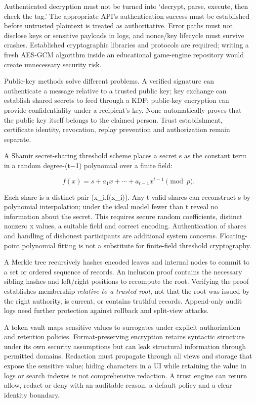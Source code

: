 Authenticated decryption must not be turned into `decrypt, parse, execute, then check the tag.' The appropriate API's authentication success must be established before untrusted plaintext is treated as authoritative. Error paths must not disclose keys or sensitive payloads in logs, and nonce/key lifecycle must survive crashes. Established cryptographic libraries and protocols are required; writing a fresh AES-GCM algorithm inside an educational game-engine repository would create unnecessary security risk.

Public-key methods solve different problems. A verified signature can authenticate a message relative to a trusted public key; key exchange can establish shared secrets to feed through a KDF; public-key encryption can provide confidentiality under a recipient's key. None automatically proves that the public key itself belongs to the claimed person. Trust establishment, certificate identity, revocation, replay prevention and authorization remain separate.

A Shamir secret-sharing threshold scheme places a secret s as the constant term in a random degree-(t−1) polynomial over a finite field:

\[
f(x)=s+a_1x+\cdots+a_{t-1}x^{t-1}\pmod p.
\]

Each share is a distinct pair (x\_i,f(x\_i)). Any t valid shares can reconstruct s by polynomial interpolation; under the ideal model fewer than t reveal no information about the secret. This requires secure random coefficients, distinct nonzero x values, a suitable field and correct encoding. Authentication of shares and handling of dishonest participants are additional system concerns. Floating-point polynomial fitting is not a substitute for finite-field threshold cryptography.

A Merkle tree recursively hashes encoded leaves and internal nodes to commit to a set or ordered sequence of records. An inclusion proof contains the necessary sibling hashes and left/right positions to recompute the root. Verifying the proof establishes membership \emph{relative to a trusted root}, not that the root was issued by the right authority, is current, or contains truthful records. Append-only audit logs need further protection against rollback and split-view attacks.

A token vault maps sensitive values to surrogates under explicit authorization and retention policies. Format-preserving encryption retains syntactic structure under its own security assumptions but can leak structural information through permitted domains. Redaction must propagate through all views and storage that expose the sensitive value; hiding characters in a UI while retaining the value in logs or search indexes is not comprehensive redaction. A trust engine can return allow, redact or deny with an auditable reason, a default policy and a clear identity boundary.

